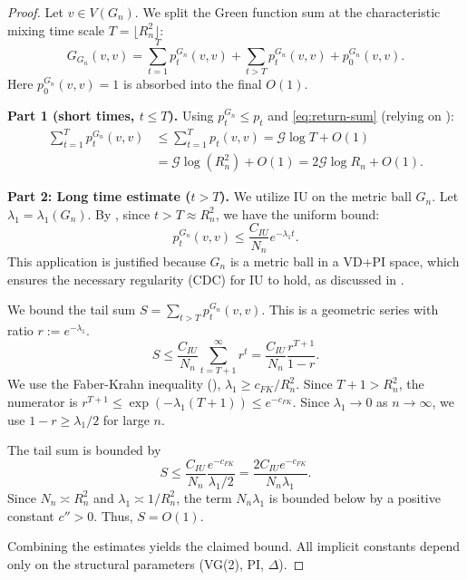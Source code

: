 \documentclass{article}
\numberwithin{equation}{section}
\theoremstyle{definition}
\theoremstyle{remark}
\newcommand{\cG}{\mathcal{G}}
\begin{document}
\begin{proof}
Let $v \in V(G_n)$. We split the Green function sum at the characteristic mixing time scale $T = \lfloor R_n^2 \rfloor$:
\[
G_{G_n}(v,v) = \sum_{t=1}^{T} p_t^{G_n}(v,v) + \sum_{t > T} p_t^{G_n}(v,v) + p_0^{G_n}(v,v).
\]
Here $p_0^{G_n}(v,v)=1$ is absorbed into the final $O(1)$.

\textbf{Part 1 (short times, $t\le T$).} Using $p_t^{G_n}\le p_t$ and \eqref{eq:return-sum} (relying on ):
\begin{align*}
\sum_{t=1}^{T} p_t^{G_n}(v,v) &\leq \sum_{t=1}^{T} p_t(v,v) = \cG \log T + O(1) \\
&= \cG \log(R_n^2) + O(1) = 2\cG \log R_n + O(1).
\end{align*}

\textbf{Part 2: Long time estimate ($t > T$).} We utilize IU on the metric ball $G_n$. Let $\lambda_1 = \lambda_1(G_n)$. By , since $t > T \approx R_n^2$, we have the uniform bound:
\begin{equation}
p_t^{G_n}(v,v) \leq \frac{C_{IU}}{N_n} e^{-\lambda_1 t}.
\end{equation}
This application is justified because $G_n$ is a metric ball in a VD+PI space, which ensures the necessary regularity (CDC) for IU to hold, as discussed in .

We bound the tail sum $S = \sum_{t > T} p_t^{G_n}(v,v)$. This is a geometric series with ratio $r:=e^{-\lambda_1}$.
\[
S \leq \frac{C_{IU}}{N_n} \sum_{t=T+1}^\infty r^t = \frac{C_{IU}}{N_n} \frac{r^{T+1}}{1-r}.
\]
We use the Faber-Krahn inequality (), $\lambda_1 \geq c_{FK}/R_n^2$. Since $T+1 > R_n^2$, the numerator is $r^{T+1} \leq \exp(-\lambda_1(T+1)) \leq e^{-c_{FK}}$. Since $\lambda_1 \to 0$ as $n \to \infty$, we use $1-r \geq \lambda_1/2$ for large $n$.

The tail sum is bounded by
\[
S \leq \frac{C_{IU}}{N_n} \frac{e^{-c_{FK}}}{\lambda_1/2} = \frac{2 C_{IU} e^{-c_{FK}}}{N_n \lambda_1}.
\]
Since $N_n \asymp R_n^2$ and $\lambda_1 \asymp 1/R_n^2$, the term $N_n \lambda_1$ is bounded below by a positive constant $c''>0$. Thus, $S = O(1)$.

Combining the estimates yields the claimed bound. All implicit constants depend only on the structural parameters (VG(2), PI, $\Delta$).
\end{proof}
\end{document}
